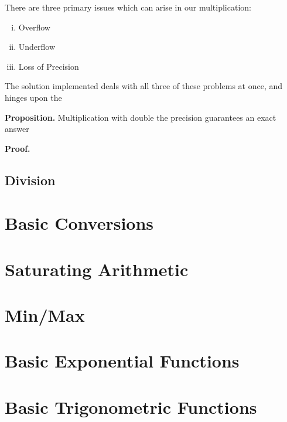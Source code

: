 \documentclass{article}
\begin{document}
There are three primary issues which can arise in our multiplication:

\begin{enumerate}[i.]

\item{Overflow}

\item{Underflow}

\item{Loss of Precision}

\end{enumerate}

The solution implemented deals with all three of these problems at once, 
and hinges upon the 

\textbf{Proposition.} Multiplication with double the precision guarantees
an exact answer

\textbf{Proof.} 


\subsection{Division}

\section{Basic Conversions}

\section{Saturating Arithmetic}

\section{Min/Max}

\section{Basic Exponential Functions}

\section{Basic Trigonometric Functions}
\end{document}
